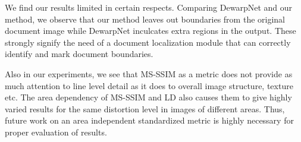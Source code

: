 \documentclass[a4paper,conference]{IEEEtran}
\begin{document}
	We find our results limited in certain respects. Comparing DewarpNet and our method, we observe that our method leaves out boundaries from the original document image while DewarpNet inculcates extra regions in the output. These strongly signify the need of a document localization module that can correctly identify and mark document boundaries.
	
	Also in our experiments, we see that MS-SSIM as a metric does not provide as much attention to line level detail as it does to overall image structure, texture etc. The area dependency of MS-SSIM and LD also causes them to give highly varied results for the same distortion level in images of different areas. Thus, future work on an area independent  standardized metric is highly necessary for proper evaluation of results.
	
	
	


	


	
	
	
	






	
	
	
	
	
\end{document}
